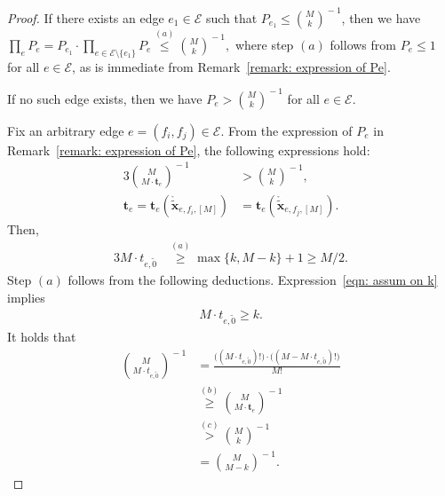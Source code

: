 \documentclass[journal]{IEEEtran}
\newcommand{\add}[1]{{\color{black}#1}}
\newcommand{\vect}[1]{ \bm{#1} }
\newcommand{\setEfull}{ \mathcal{E} }
\newcommand{\vt}{ \vect{t} }
\newcommand{\LCTtv}[1]{ \mathring{ \tilde{ \vect{#1} } } }
\newcommand{\efi}{ e,f_i }
\newcommand{\efj}{ e,f_j }
\newcommand{\tzero}{\tilde{0}}
\begin{document}
\begin{appendices}
\begin{proof}
    \add{If there exists an edge
    $ e_{1} \in \setEfull $ such that
    $ P_{e_{1}} \leq \binom{ M }{ k }^{\!\! -1} $,
    then we have
    $
      \prod_{e}
      P_{e}
      =
      P_{e_{1}}
      \cdot
      \prod_{e \in \setEfull \setminus \{e_{1}\}}
      P_{e}
      \overset{(a)}{\leq}\binom{M}{k}^{\!-1},
    $
    where step $(a)$ follows from $ P_{e} \leq 1 $ for all $ e \in \setEfull $, as is immediate from Remark~\ref{remark: expression of Pe}.

    If no such edge exists, then we have
    $
      P_{e}
      > \binom{ M }{ k }^{\!\! -1}
    $ for all $ e \in \setEfull $.

    Fix an arbitrary edge $ e = (f_{i},f_{j}) \in \setEfull $.
    From the expression of $P_{e}$ in Remark~\ref{remark: expression of Pe},
    the following expressions hold:
    \begin{alignat}{3}
      \binom{M}{ M \cdot \vt_{e} }^{\!\!-1}
       & > \binom{ M }{ k }^{\!\! -1},
      \label{eqn: ineq of types te}     \\
      \vt_{e}
      = \vt_e(\LCTtv{x}_{\efi,[M]})
       & = \vt_e(\LCTtv{x}_{\efj,[M]}).
      \label{eqn: positive of pe}
    \end{alignat}
    Then,
    \begin{alignat}{3}
      M \cdot t_{e,\tzero} & \overset{(a)}{\geq} \max\{ k, M-k \} + 1 \geq M/2.
      \label{eqn: lower bound of tzero}
    \end{alignat}
    Step $(a)$ follows from the following deductions. Expression~\eqref{eqn: assum on k} implies
    \begin{align}
      M \cdot t_{e,\tzero} \geq k. \label{eqn: ineq of M tero: 1}
    \end{align}
    It holds that
    \begin{align}
      \binom{M}{M \cdot t_{e,\tzero}}^{\!\! -1}
       & =
      \frac{
        \bigl( (M \cdot t_{ e, \tzero })! \bigr)
        \cdot
        \bigl( ( M - M \cdot t_{ e, \tzero } )! \bigr)
      }{M!}
      \nonumber                                                         \\
       & \overset{(b)}{\geq}
      \binom{M}{ M \cdot \vt_{e} }^{\!\!-1}
      \nonumber                                                         \\
       & \overset{(c)}{>}\binom{ M }{ k }^{\!\! -1}
      \nonumber                                                         \\
       & = \binom{ M }{ M-k }^{\!\! -1}. \label{eqn: ineq of M tero: 2}

\end{align}}
\end{proof}
\end{appendices}
\end{document}
